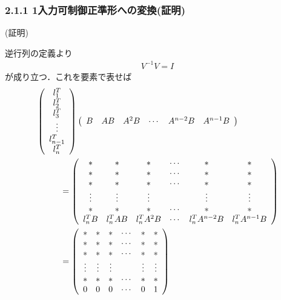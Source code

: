 \begin{frame}[t]
\frametitle{2.1.1 1入力可制御正準形への変換(証明)}


\noindent
(証明)

逆行列の定義より
\begin{align}
 V^{-1} V = I
\end{align}
が成り立つ．これを要素で表せば
\begin{align}
	&
	\left(\begin{array}{c}
		 l_1^T \\
		 l_2^T \\
		 l_3^T \\
		 \vdots \\
		 l_{n-1}^T \\
		 l_n^T
	\end{array}\right)
	\left(\begin{array}{cccccc}
            B & A B & A^2 B & \cdots &A^{n-2}B &  A^{n-1} B
	\end{array}\right)
\nonumber\\
	& \hspace*{1cm}=
	\left(\begin{array}{cccccc}
		 *       & *         & *           & \cdots & *              & *              \\
		 *       & *         & *           & \cdots & *              & *              \\
		 *       & *         & *           & \cdots & *              & *              \\
		 \vdots  & \vdots    & \vdots      &        & \vdots         & \vdots         \\
		 *       & *         & *           & \cdots & *              & *              \\
		 l_n^T B & l_n^T A B & l_n^T A^2 B & \cdots & l_n^T A^{n-2}B & l_n^T A^{n-1}B
	\end{array}\right)
\nonumber\\
	& \hspace*{1cm}=
	\left(\begin{array}{cccccc}
		 *       & *         & *           & \cdots & *              & *              \\
		 *       & *         & *           & \cdots & *              & *              \\
		 *       & *         & *           & \cdots & *              & *              \\
		 \vdots  & \vdots    & \vdots      &        & \vdots         & \vdots         \\
		 *       & *         & *           & \cdots & *              & *              \\
		 0       & 0         & 0           & \cdots & 0              & 1
	\end{array}\right)
\end{align}
\end{frame}

